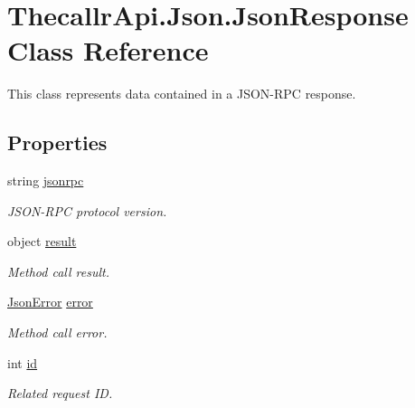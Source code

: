 \hypertarget{class_thecallr_api_1_1_json_1_1_json_response}{\section{Thecallr\+Api.\+Json.\+Json\+Response Class Reference}
\label{class_thecallr_api_1_1_json_1_1_json_response}
}


This class represents data contained in a J\+S\+O\+N-\/\+R\+P\+C response.  


\subsection*{Properties}
\begin{DoxyCompactItemize}
\item 
string \hyperlink{class_thecallr_api_1_1_json_1_1_json_response_a37a1a8e1a7317edcd56456911cd72cbf}{jsonrpc}
\begin{DoxyCompactList}\small\item\em J\+S\+O\+N-\/\+R\+P\+C protocol version. \end{DoxyCompactList}\item 
object \hyperlink{class_thecallr_api_1_1_json_1_1_json_response_a4366a7a60d9781436d368ab499ec6ae8}{result}
\begin{DoxyCompactList}\small\item\em Method call result. \end{DoxyCompactList}\item 
\hyperlink{class_thecallr_api_1_1_json_1_1_json_error}{Json\+Error} \hyperlink{class_thecallr_api_1_1_json_1_1_json_response_aff2a4d7e08a310c009d90f7d9278f179}{error}
\begin{DoxyCompactList}\small\item\em Method call error. \end{DoxyCompactList}\item 
int \hyperlink{class_thecallr_api_1_1_json_1_1_json_response_a234bb72dabad32bff0d92a4f391d8e94}{id}
\begin{DoxyCompactList}\small\item\em Related request I\+D. \end{DoxyCompactList}\end{DoxyCompactItemize}



